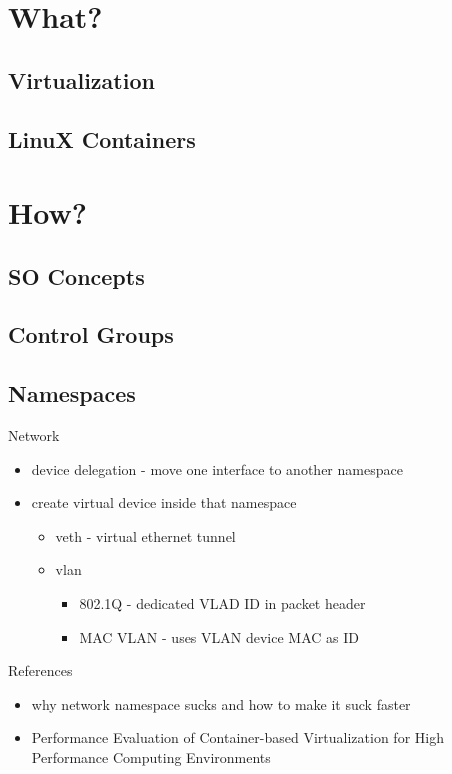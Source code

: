 \documentclass{beamer}
\begin{document}
\section{What?}

\subsection{Virtualization}

\subsection{LinuX Containers}

\section{How?}

\subsection{SO Concepts}

\subsection{Control Groups}

\subsection{Namespaces}

\begin{frame}{Network}
\begin{itemize}
\item device delegation - move one interface to another namespace
\item create virtual device inside that namespace
\begin{itemize}
\item veth - virtual ethernet tunnel
\item vlan
\begin{itemize}
\item 802.1Q - dedicated VLAD ID in packet header
\item MAC VLAN - uses VLAN device MAC as ID
\end{itemize}
\end{itemize}
\end{itemize}
\end{frame}

\begin{frame}{References}
\begin{itemize}
\item why network namespace sucks and how to make it suck faster
\item Performance Evaluation of Container-based Virtualization for High Performance Computing Environments
\end{itemize}
\end{frame}


\end{document}
